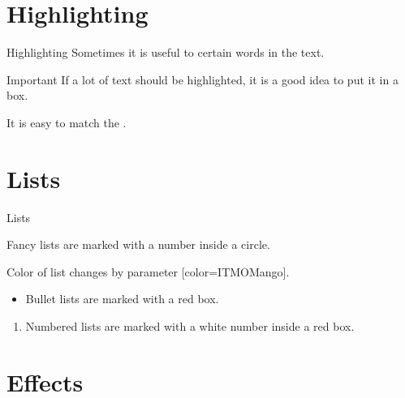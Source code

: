 \documentclass[11pt, aspectratio=169]{beamer}
\begin{document}
\section{Highlighting}


\begin{frame}{Highlighting}
    Sometimes it is useful to  certain words in the text.

    \begin{alertblock}{Important}
        If a lot of text should be \alert{highlighted}, it is a good idea to put it in a box.
    \end{alertblock}
    

    It is easy to match the .
\end{frame}


\section{Lists}


\begin{frame}{Lists}
    \begin{fancylist}
        \item Fancy lists are marked with a number inside a circle.
    \end{fancylist}

    \begin{fancylist}[color=ITMOMango]
        \item Color of list changes by parameter [color=ITMOMango].
    \end{fancylist}

    \begin{itemize}
        \item
        Bullet lists are marked with a red box.
    \end{itemize}

    \begin{enumerate}
        \item
        Numbered lists are marked with a white number inside a red box.
    \end{enumerate}
\end{frame}


\section{Effects}
\end{document}
